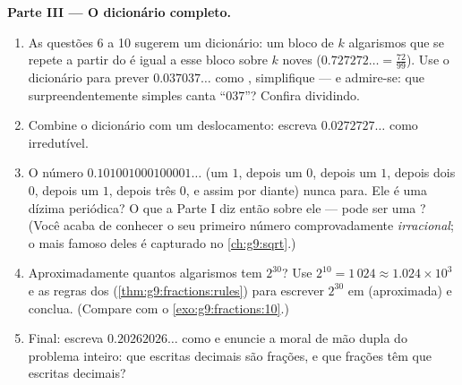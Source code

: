 \begin{problem}
\medskip
\noindent\textbf{Parte III --- O dicionário completo.}
\begin{enumerate}[resume]
  \item As questões 6 a 10 sugerem um dicionário: um bloco de $k$
        algarismos que se repete a partir do  é igual a
        esse bloco sobre $k$ noves ($0.727272\ldots = \frac{72}{99}$).
        Use o dicionário para prever $0.037037\ldots$ como ,
        simplifique --- e admire-se: que  surpreendentemente
        simples canta ``$037$''? Confira dividindo.
  \item Combine o dicionário com um deslocamento: escreva
        $0.0272727\ldots$ como  irredutível.
  \item O número $0.101001000100001\ldots$ (um $1$, depois um $0$,
        depois um $1$, depois dois $0$, depois um $1$, depois três $0$,
        e assim por diante) nunca para. Ele é uma dízima periódica? O
        que a Parte I diz então sobre ele --- pode ser uma ?
        (Você acaba de conhecer o seu primeiro número comprovadamente
        \emph{irracional}; o mais famoso deles é capturado no
        \cref{ch:g9:sqrt}.)
  \item Aproximadamente quantos algarismos tem $2^{30}$? Use
        $2^{10} = 1\,024 \approx 1.024 \times 10^3$ e as regras dos
         (\cref{thm:g9:fractions:rules}) para escrever
        $2^{30}$ em  (aproximada) e conclua. (Compare
        com o \cref{exo:g9:fractions:10}.)
  \item Final: escreva $0.20262026\ldots$ como  e enuncie a moral
        de mão dupla do problema inteiro: que escritas decimais são
        frações, e que frações têm que escritas decimais?
\end{enumerate}
\end{problem}
